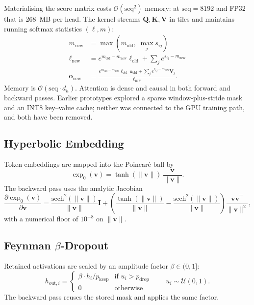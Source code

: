 \documentclass[11pt,a4paper]{article}
\begin{document}
Materialising the score matrix costs $\mathcal{O}(\text{seq}^2)$ memory:
at $\text{seq}=8192$ and FP32 that is 268~MB per head. The kernel
streams $\mathbf{Q},\mathbf{K},\mathbf{V}$ in tiles and maintains running
softmax statistics $(\ell,m)$:
\begin{align}
  m_{\text{new}} &= \max(m_{\text{old}},\;\max_j s_{ij})\\
  \ell_{\text{new}} &= e^{m_{\text{old}}-m_{\text{new}}}\ell_{\text{old}} + \sum_j e^{s_{ij}-m_{\text{new}}}\\
  \mathbf{o}_{\text{new}} &= \frac{e^{m_{\text{old}}-m_{\text{new}}}\ell_{\text{old}}\,\mathbf{o}_{\text{old}} + \sum_j e^{s_{ij}-m_{\text{new}}}\mathbf{V}_j}{\ell_{\text{new}}}.
\end{align}
Memory is $\mathcal{O}(\text{seq}\cdot d_h)$. Attention is dense and
causal in both forward and backward passes. Earlier prototypes
explored a sparse window-plus-stride mask and an INT8 key--value cache;
neither was connected to the GPU training path, and both have been
removed.

\subsection{Hyperbolic Embedding}
\label{sec:hyperbolic}

Token embeddings are mapped into the Poincar\'e ball by
\begin{equation}
  \exp_0(\mathbf{v}) = \tanh(\|\mathbf{v}\|)\,\frac{\mathbf{v}}{\|\mathbf{v}\|}.
\end{equation}
The backward pass uses the analytic Jacobian
\begin{equation}
  \frac{\partial \exp_0(\mathbf{v})}{\partial \mathbf{v}}
  = \frac{\text{sech}^2(\|\mathbf{v}\|)}{\|\mathbf{v}\|}\mathbf{I}
  + \left(\frac{\tanh(\|\mathbf{v}\|)}{\|\mathbf{v}\|}
    - \frac{\text{sech}^2(\|\mathbf{v}\|)}{\|\mathbf{v}\|}\right)
    \frac{\mathbf{v}\mathbf{v}^\top}{\|\mathbf{v}\|^2},
\end{equation}
with a numerical floor of $10^{-8}$ on $\|\mathbf{v}\|$.

\subsection{Feynman \texorpdfstring{$\beta$}{beta}-Dropout}
\label{sec:feynman_dropout}

Retained activations are scaled by an amplitude factor $\beta\in(0,1]$:
\begin{equation}
  h_{\text{out},i} = \begin{cases}
    \beta \cdot h_i / p_{\text{keep}} & \text{if } u_i > p_{\text{drop}}\\
    0 & \text{otherwise}
  \end{cases}
  \qquad u_i\sim\mathcal{U}(0,1).
\end{equation}
The backward pass reuses the stored mask and applies the same factor.
\end{document}
